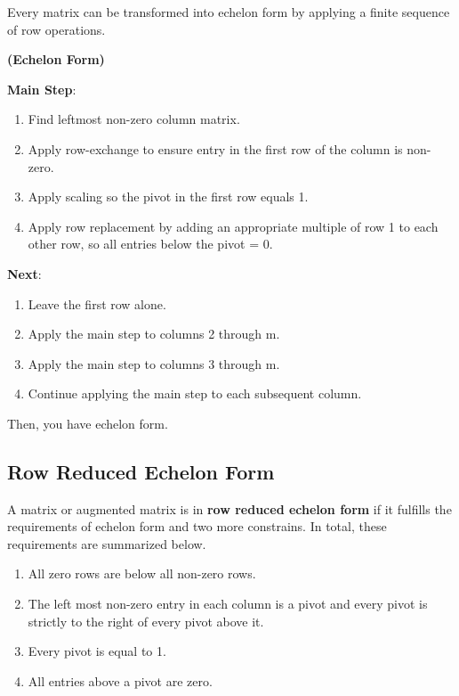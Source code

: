 \begin{thm}
    Every matrix can be transformed into echelon form by applying a finite sequence of row operations.
\end{thm}

\begin{strat} \textbf{(Echelon Form)}

    \textbf{Main Step}:
    \begin{enumerate}
        \item Find leftmost non-zero column matrix.
        \item Apply row-exchange to ensure entry in the first row of the column is non-zero.
        \item Apply scaling so the pivot in the first row equals 1.
        \item Apply row replacement by adding an appropriate multiple of row 1 to each other row, so all entries below the pivot = 0.
    \end{enumerate}

    \textbf{Next}:
    \begin{enumerate}
        \item Leave the first row alone.
        \item Apply the main step to columns 2 through m.
        \item Apply the main step to columns 3 through m.
        \item Continue applying the main step to each subsequent column.
    \end{enumerate}

    Then, you have echelon form.
\end{strat}

\subsection{Row Reduced Echelon Form}
\begin{definition}
    A matrix or augmented matrix is in \textbf{row reduced echelon form} if it fulfills the requirements of echelon form and two more constrains.
    In total, these requirements are summarized below.
    \begin{enumerate}
        \item All zero rows are below all non-zero rows.
        \item The left most non-zero entry in each column is a pivot and every pivot is strictly to the right of every pivot above it.
        \item Every pivot is equal to 1.
        \item All entries above a pivot are zero.
    \end{enumerate}
\end{definition}

